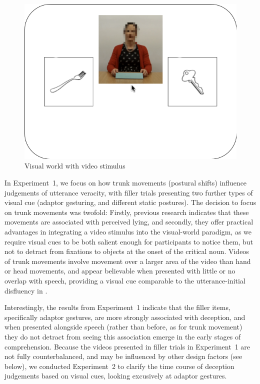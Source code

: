\documentclass[a4paper,man,natbib]{apa6}
\begin{document}
\begin{figure}[Ht]
  \centering
	\includegraphics[width=\linewidth]{./img/e7_layout.png}
  \caption{Visual world with video stimulus}
  \label{fig:v1_layout}
\end{figure}

In Experiment~1, we focus on how trunk movements (postural shifts) influence judgements of utterance veracity, with filler trials presenting two further types of visual cue (adaptor gesturing, and different static postures).
The decision to focus on trunk movements was twofold: Firstly, previous research indicates that these movements are associated with perceived lying\citep{Vrij1996a}, and secondly, they offer practical advantages in integrating a video stimulus into the visual-world paradigm, as we require visual cues to be both salient enough for participants to notice them, but not to detract from fixations to objects at the onset of the critical noun.
Videos of trunk movements involve movement over a larger area of the video than hand or head movements, and appear believable when presented with little or no overlap with speech, providing a visual cue comparable to the utterance-initial disfluency in \citet{Loy2017}.

Interestingly, the results from Experiment~1 indicate that the filler items, specifically adaptor gestures, are more strongly associated with deception, and when presented alongside speech (rather than before, as for trunk movement) they do not detract from seeing this association emerge in the early stages of comprehension.
Because the videos presented in filler trials in Experiment~1 are not fully counterbalanced, and may be influenced by other design factors (see below), we conducted Experiment~2 to clarify the time course of deception judgements based on visual cues, looking excusively at adaptor gestures.
\end{document}
